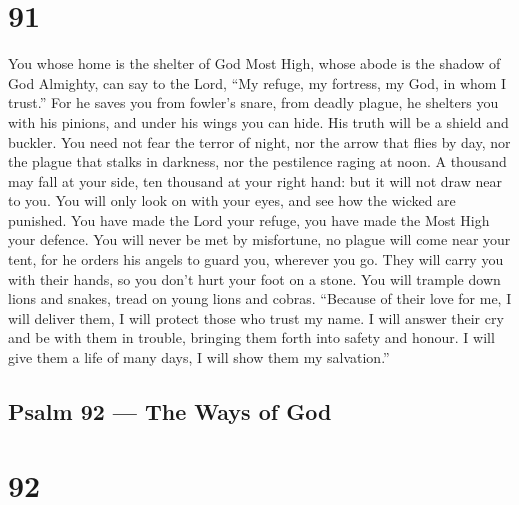 \hypertarget{section-90}{%
\section{91}\label{section-90}}

 You whose home is the shelter of God Most High, whose abode
is the shadow of God Almighty,  can say to the Lord, ``My
refuge, my fortress, my God, in whom I trust.''  For he
saves you from fowler's snare, from deadly plague,  he
shelters you with his pinions, and under his wings you can hide. His
truth will be a shield and buckler.  You need not fear the
terror of night, nor the arrow that flies by day,  nor the
plague that stalks in darkness, nor the pestilence raging at noon.
 A thousand may fall at your side, ten thousand at your
right hand: but it will not draw near to you.  You will only
look on with your eyes, and see how the wicked are punished.
 You have made the Lord your refuge, you have made the Most
High your defence.  You will never be met by misfortune, no
plague will come near your tent,  for he orders his angels
to guard you, wherever you go.  They will carry you with
their hands, so you don't hurt your foot on a stone.  You
will trample down lions and snakes, tread on young lions and cobras.
 ``Because of their love for me, I will deliver them, I
will protect those who trust my name.  I will answer their
cry and be with them in trouble, bringing them forth into safety and
honour.  I will give them a life of many days, I will show
them my salvation.''

\hypertarget{psalm-92-the-ways-of-god}{%
\subsection{Psalm 92 --- The Ways of
God}\label{psalm-92-the-ways-of-god}}

\hypertarget{section-91}{%
\section{92}\label{section-91}}

